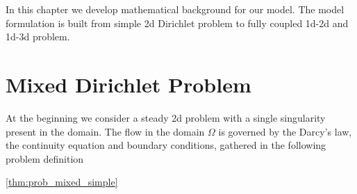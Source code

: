 
% 

In this chapter we develop mathematical background for our model.
The model formulation is built from simple 2d Dirichlet problem to fully coupled 1d-2d and 1d-3d problem.

\section{Mixed Dirichlet Problem}

At the beginning we consider a steady 2d problem with a single singularity present in the domain.
The flow in the domain $\Omega$ is governed by the Darcy's law, the continuity equation and
boundary conditions, gathered in the following problem definition

\ref{thm:prob_mixed_simple}

